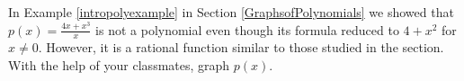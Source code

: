 {In Example \ref{intropolyexample} in Section \ref{GraphsofPolynomials} we showed that $p(x) = \frac{4x+x^3}{x}$ is not a polynomial even though its formula reduced to $4 + x^{2}$ for $x \neq 0$.  However, it is a rational function similar to those studied in the section.  With the help of your classmates, graph $p(x)$.}
{}